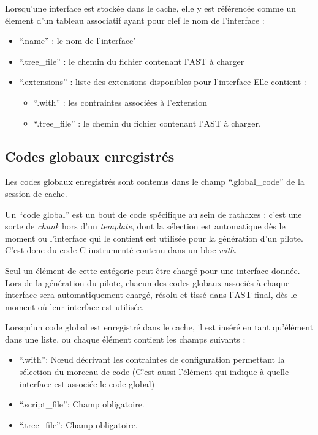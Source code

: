 \documentclass[french]{rtxreport}
\begin{document}
Lorsqu'une interface est stockée dans le cache, elle y est référencée comme un
élement d'un tableau associatif ayant pour clef le nom de l'interface :
\begin{itemize}
    \item ``.name'' : le nom de l'interface'
    \item ``.tree\_file'' : le chemin du fichier contenant l'AST à charger
    \item ``.extensions'' : liste des extensions disponibles pour l'interface
        Elle contient :
        \begin{itemize}
            \item ``.with'' : les contraintes associées à l'extension
            \item ``.tree\_file'' : le chemin du fichier contenant l'AST à
                charger.
        \end{itemize}
\end{itemize}


\subsection{Codes globaux enregistrés}

Les codes globaux enregistrés sont contenus dans le champ ``.global\_code'' de
la session de cache.

Un ``code global'' est un bout de code spécifique au sein de rathaxes : c'est
une sorte de \emph{chunk} hors d'un \emph{template}, dont la sélection est
automatique dès le moment ou l'interface qui le contient est utilisée pour la
génération d'un pilote. C'est donc du code C instrumenté contenu dans un bloc
\emph{with}.

Seul un élément de cette catégorie peut être chargé pour une interface donnée.
Lors de la génération du pilote, chacun des codes globaux associés à chaque
interface sera automatiquement chargé, résolu et tissé dans l'AST final, dès le
moment où leur interface est utilisée.

Lorsqu'un code global est enregistré dans le cache, il est inséré en tant
qu'élément dans une liste, ou chaque élément contient les champs suivants :
\begin{itemize}
    \item ``.with'': Nœud décrivant les contraintes de configuration
        permettant la sélection du morceau de code (C'est aussi l'élément qui
        indique à quelle interface est associée le code global)
    \item ``.script\_file'': Champ obligatoire.
    \item ``.tree\_file'': Champ obligatoire.
\end{itemize}
\end{document}
